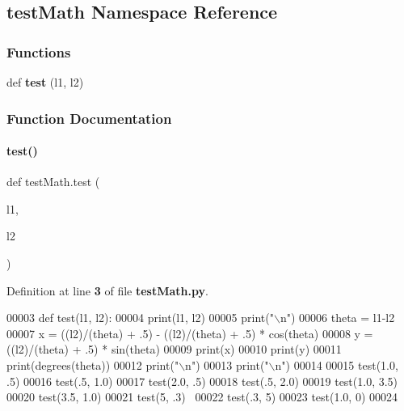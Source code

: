 \subsection{test\+Math Namespace Reference}
\label{namespacetest_math}
\subsubsection*{Functions}
\begin{DoxyCompactItemize}
\item 
def \textbf{ test} (l1, l2)
\end{DoxyCompactItemize}


\subsubsection{Function Documentation}
\mbox{\label{namespacetest_math_aa1a3d4e1c4f74f13640e69f5e9e1ce39}} 
\paragraph{test()}
{\footnotesize\ttfamily def test\+Math.\+test (\begin{DoxyParamCaption}\item[{}]{l1,  }\item[{}]{l2 }\end{DoxyParamCaption})}



Definition at line \textbf{ 3} of file \textbf{ test\+Math.\+py}.


\begin{DoxyCode}
00003 \textcolor{keyword}{def }test(l1, l2):
00004     print(l1, l2)
00005     print(\textcolor{stringliteral}{"\(\backslash\)n"})
00006     theta = l1-l2
00007     x = ((l2)/(theta) + .5) - ((l2)/(theta) + .5) * cos(theta)
00008     y = ((l2)/(theta) + .5) * sin(theta)
00009     print(x)
00010     print(y)
00011     print(degrees(theta))
00012     print(\textcolor{stringliteral}{"\(\backslash\)n"})
00013     print(\textcolor{stringliteral}{"\(\backslash\)n"})
00014 
00015 test(1.0, .5)
00016 test(.5, 1.0)
00017 test(2.0, .5)
00018 test(.5, 2.0)
00019 test(1.0, 3.5)
00020 test(3.5, 1.0)
00021 test(5, .3) 
00022 test(.3, 5)
00023 test(1.0, 0)
00024 \end{DoxyCode}
